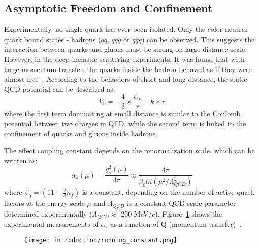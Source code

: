 \subsection{Asymptotic Freedom and Confinement}
Experimentally, no single quark has ever been isolated. Only the color-neutral quark bound states - hadrons ($q\bar{q}$, $qqq$ or $\bar{q}\bar{q}\bar{q}$) can be observed. This suggests the interaction between quarks and gluons must be strong on large distance scale. However, in the deep inelastic scattering experiments. It was found that with large momentum transfer, the quarks inside the hadron behaved as if they were almost free~\cite{DISasymptotic}. According to the behaviors of short and long distance, the static QCD potential can be described as:
\begin{equation} 
V_{s} = -\frac{4}{3} \times \frac{\alpha_{s}}{r} + k \times r 
\label{QCDpotential}
\end{equation}
where the first term dominating at small distance is similar to the Coulomb potential between two charges in QED, while the second term is linked to the confinement of quarks and gluons inside hadrons.  

The effect coupling constant depends on the renormalization scale, which can be written as: 
\begin{equation} 
\alpha_{s}(\mu) = \frac{g^{2}_{s}(\mu)}{4\pi} \approx \frac{4\pi}{\beta_{0}ln(\mu^{2}/\Lambda^{2}_{QCD})} 
\label{runningConst}
\end{equation}
where $\beta_{0} = (11 - \frac{2}{3}n_{f})$ is a constant, depending on the number of active quark flavors at the energy scale $\mu$ and $\Lambda_{QCD}$ is a constant QCD scale parameter determined experimentally ($\Lambda_{QCD}\approx$ 250 MeV/$c$). Figure~\ref{runningConstant} shows the experimental measurements of $\alpha_{s}$ as a function of Q (momentum transfer)~\cite{runningExp}.

\begin{figure}[htbp]
\centering
\texttt{[image: introduction/running\_constant.png]}
 \label{runningConstant}
\end{figure}

